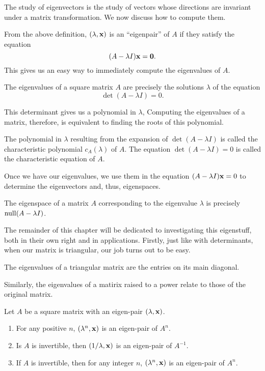 \documentclass[../m73main.tex]{subfiles}
\begin{document}
The study of eigenvectors is the study of vectors whose directions are invariant under a matrix transformation.
We now discuss how to compute them.

From the above definition, $(\lambda, \mathbf{x})$ is an ``eigenpair'' of $A$ if they satisfy the equation
\[ (A - \lambda I) \mathbf{x} = \mathbf{0}. \]
This gives us an easy way to immediately compute the eigenvalues of $A$.

\begin{theorem}
	The eigenvalues of a square matrix $A$ are precisely the solutions $\lambda$ of the equation
	\[ \det (A - \lambda I) = 0. \]
\end{theorem}

This determinant gives us a polynomial in $\lambda$,
Computing the eigenvalues of a matrix, therefore, is equivalent to finding the roots of this polynomial.

\begin{definition}
	The polynomial in $\lambda$ resulting from the expansion of $\det (A - \lambda I)$ is called the characteristic polynomial $c_A (\lambda)$ of $A$.
	The equation $\det (A - \lambda I) = 0$ is called the characteristic equation of $A$.
\end{definition}

Once we have our eigenvalues, we use them in the equation $(A - \lambda I) \mathbf{x} = 0$ to determine the eigenvectors and, thus, eigenspaces.

\begin{theorem}
	The eigenspace of a matrix $A$ corresponding to the eigenvalue $\lambda$ is precisely $\textrm{null} (A - \lambda I)$.
\end{theorem}

The remainder of this chapter will be dedicated to investigating this eigenstuff, both in their own right and in applications.
Firstly, just like with determinants, when our matrix is triangular, our job turns out to be easy.

\begin{theorem}
	The eigenvalues of a triangular matrix are the entries on its main diagonal.
\end{theorem}

Similarly, the eigenvalues of a matirix raised to a power relate to those of the original matrix.

\begin{theorem}
	Let $A$ be a square matrix with an eigen-pair $(\lambda, \mathbf{x})$.
	\begin{enumerate}[label=(\alph*)]
		\item For any positive $n$, $(\lambda^n, \mathbf{x})$ is an eigen-pair of $A^n$.
		\item Is $A$ is invertible, then $(1/\lambda, \mathbf{x})$ is an eigen-pair of $A^{-1}$.
		\item If $A$ is invertible, then for any integer $n$, $(\lambda^n, \mathbf{x})$ is an eigen-pair of $A^n$.
	\end{enumerate}
\end{theorem}
\end{document}
